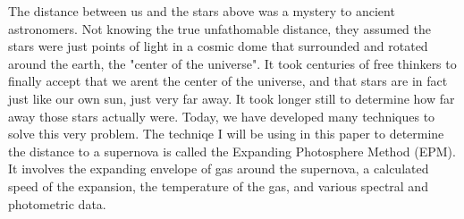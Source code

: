 The distance between us and the stars above was a mystery to ancient 
astronomers. Not knowing the true unfathomable distance, they assumed
the stars were just points of light in a cosmic dome that surrounded
and rotated around the earth, the "center of the universe". It took 
centuries of free thinkers to finally accept that we arent the center 
of the universe, and that stars are in fact just like our own sun, just 
very far away. It took longer still to determine how far away those stars
actually were. Today, we have developed many techniques to solve this very 
problem. The techniqe I will be using in this paper to determine the distance
to a supernova is called the Expanding Photosphere Method (EPM). It involves the 
expanding envelope of gas around the supernova, a calculated speed of the
expansion, the temperature of the gas, and various spectral and photometric data.
